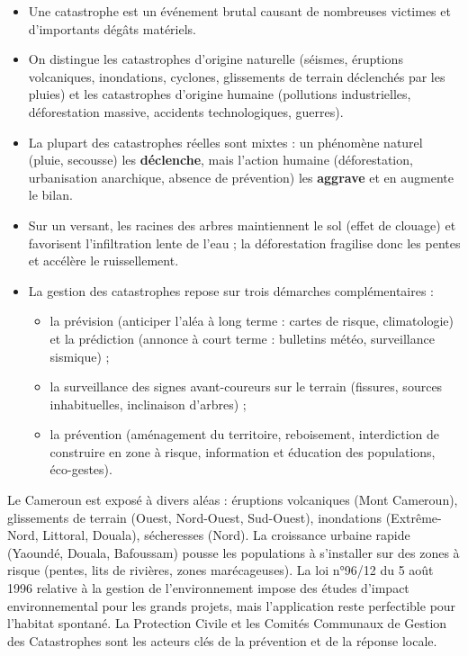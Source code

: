 \documentclass[11pt]{article}
\newcommand{\cle}[1]{{\popxbold\color{popdark}#1}}
\begin{document}
\begin{aretenir}
\begin{itemize}
\item Une \cle{catastrophe} est un événement brutal causant de nombreuses victimes et d'importants dégâts matériels.
\item On distingue les catastrophes d'origine \cle{naturelle} (séismes, éruptions volcaniques, inondations, cyclones, glissements de terrain déclenchés par les pluies) et les catastrophes d'origine \cle{humaine} (pollutions industrielles, déforestation massive, accidents technologiques, guerres).
\item La plupart des catastrophes réelles sont \cle{mixtes} : un phénomène naturel (pluie, secousse) les \textbf{déclenche}, mais l'action humaine (déforestation, urbanisation anarchique, absence de prévention) les \textbf{aggrave} et en augmente le bilan.
\item Sur un versant, les \cle{racines des arbres} maintiennent le sol (effet de clouage) et favorisent l'infiltration lente de l'eau ; la déforestation fragilise donc les pentes et accélère le ruissellement.
\item La gestion des catastrophes repose sur trois démarches complémentaires :
      \begin{itemize}
      \item la \cle{prévision} (anticiper l'aléa à long terme : cartes de risque, climatologie) et la \cle{prédiction} (annonce à court terme : bulletins météo, surveillance sismique) ;
      \item la \cle{surveillance} des signes avant-coureurs sur le terrain (fissures, sources inhabituelles, inclinaison d'arbres) ;
      \item la \cle{prévention} (aménagement du territoire, reboisement, interdiction de construire en zone à risque, information et éducation des populations, éco-gestes).
      \end{itemize}
\end{itemize}
\end{aretenir}

\begin{savaistu}
Le Cameroun est exposé à divers aléas : éruptions volcaniques (Mont Cameroun), glissements de terrain (Ouest, Nord-Ouest, Sud-Ouest), inondations (Extrême-Nord, Littoral, Douala), sécheresses (Nord). La croissance urbaine rapide (Yaoundé, Douala, Bafoussam) pousse les populations à s'installer sur des zones à risque (pentes, lits de rivières, zones marécageuses). La \cle{loi n°96/12 du 5 août 1996} relative à la gestion de l'environnement impose des études d'impact environnemental pour les grands projets, mais l'application reste perfectible pour l'habitat spontané. La \cle{Protection Civile} et les \cle{Comités Communaux de Gestion des Catastrophes} sont les acteurs clés de la prévention et de la réponse locale.
\end{savaistu}
\end{document}
